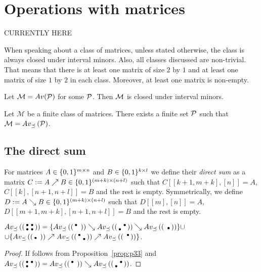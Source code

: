 \chapter{Operations with matrices}
CURRENTLY HERE

When speaking about a class of matrices, unless stated otherwise, the class is always closed under interval minors. Also, all classes discussed are non-trivial. That means that there is at least one matrix of size $2$ by $1$ and at least one matrix of size $1$ by $2$ in each class. Moreover, at least one matrix is non-empty.

\begin{obs}
Let $\mathcal{M}=Av(\mathcal{P})$ for some $\mathcal{P}$. Then $\mathcal{M}$ is closed under interval minors.
\end{obs}

\begin{obs}
Let $\mathcal{M}$ be a finite class of matrices. There exists a finite set $\mathcal{P}$ such that $\mathcal{M}=Av_{\preceq}\left(\mathcal{P}\right)$.
\end{obs}

\section{The direct sum}

\begin{defn}
For matrices $A\in\{0,1\}^{m\times n}$ and $B\in\{0,1\}^{k\times l}$ we define their \emph{direct sum} as a matrix $C:=A\nearrow B\in\{0,1\}^{(m+k)\times(n+l)}$ such that $C[[k+1,m+k],[n]]=A$, $C[[k],[n+1,n+l]]=B$ and the rest is empty. Symmetrically, we define $D:=A\searrow B\in\{0,1\}^{(m+k)\times(n+l)}$ such that $D[[m],[n]]=A$, $D[[m+1,m+k],[n+1,n+l]]=B$ and the rest is empty.
\end{defn}

\begin{prop}
$Av_{\preceq}\left(\left(\begin{smallmatrix}\bullet&\bullet\\\bullet&\bullet\end{smallmatrix}\right)\right)=\{Av_{\preceq}\left(\left(\begin{smallmatrix}\bullet& \\ & \end{smallmatrix}\right)\right)\searrow Av_{\preceq}\left(\left(\begin{smallmatrix} &\bullet\\\bullet& \end{smallmatrix}\right)\right)\searrow Av_{\preceq}\left(\left(\begin{smallmatrix} & \\ &\bullet\end{smallmatrix}\right)\right)\}\cup$\\
$\cup\{Av_{\preceq}\left(\left(\begin{smallmatrix} & \\\bullet& \end{smallmatrix}\right)\right)\nearrow Av_{\preceq}\left(\left(\begin{smallmatrix}\bullet& \\ &\bullet\end{smallmatrix}\right)\right)\nearrow Av_{\preceq}\left(\left(\begin{smallmatrix} &\bullet\\ & \end{smallmatrix}\right)\right)\}$.
\end{prop}
\begin{proof}
If follows from Proposition~\ref{prop:p33} and $Av_{\preceq}\left(\left(\begin{smallmatrix}\bullet&\bullet\\\bullet& \end{smallmatrix}\right)\right)=Av_{\preceq}\left(\left(\begin{smallmatrix}\bullet& \\ & \end{smallmatrix}\right)\right)\searrow Av_{\preceq}\left(\left(\begin{smallmatrix} &\bullet\\\bullet& \end{smallmatrix}\right)\right)$.
\end{proof}

